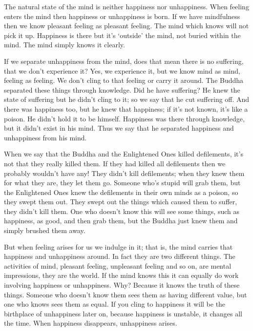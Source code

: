 The natural state of the mind is neither happiness nor unhappiness. When feeling enters the mind then happiness or unhappiness is born. If we have mindfulness then we know pleasant feeling as pleasant feeling. The mind which knows will not pick it up. Happiness is there but it's `outside' the mind, not buried within the mind. The mind simply knows it clearly. 

If we separate unhappiness from the mind, does that mean there is no suffering, that we don't experience it? Yes, we experience it, but we know mind as mind, feeling as feeling. We don't cling to that feeling or carry it around. The Buddha separated these things through knowledge. Did he have suffering? He knew the state of suffering but he didn't cling to it; so we say that he cut suffering off. And there was happiness too, but he knew that happiness; if it's not known, it's like a poison. He didn't hold it to be himself. Happiness was there through knowledge, but it didn't exist in his mind. Thus we say that he separated happiness and unhappiness from his mind. 

When we say that the Buddha and the Enlightened Ones killed defilements, it's not that they really killed them. If they had killed all defilements then we probably wouldn't have any! They didn't kill defilements; when they knew them for what they are, they let them go. Someone who's stupid will grab them, but the Enlightened Ones knew the defilements in their own minds as a poison, so they swept them out. They swept out the things which caused them to suffer, they didn't kill them. One who doesn't know this will see some things, such as happiness, as good, and then grab them, but the Buddha just knew them and simply brushed them away. 

But when feeling arises for us we indulge in it; that is, the mind carries that happiness and unhappiness around. In fact they are two different things. The activities of mind, pleasant feeling, unpleasant feeling and so on, are mental impressions, they are the world. If the mind knows this it can equally do work involving happiness or unhappiness. Why? Because it knows the truth of these things. Someone who doesn't know them sees them as having different value, but one who knows sees them as equal. If you cling to happiness it will be the birthplace of unhappiness later on, because happiness is unstable, it changes all the time. When happiness disappears, unhappiness arises. 

